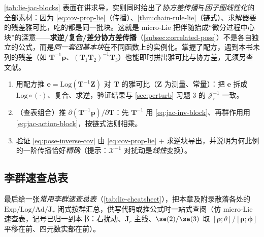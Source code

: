 \begin{insight}[一张表打通“求导”与“传播”]
\cref{tab:lie-jac-blocks} 表面在讲求导，实则同时给出了\emph{协方差传播}与\emph{因子图线性化}的全部素材：因为 \cref{eq:cov-prop-lie}（传播）、\cref{thm:chain-rule-lie}（链式）、求解器要的残差雅可比，吃的都是同一批块。这就是 micro-Lie 把伴随抬成“微分过程中心块”的深意——\textbf{求逆/复合/差分协方差传播}（\cref{subsec:correlated-pose}）不是各自独立的公式，而是\emph{同一套四基本块}在不同函数上的实例化。掌握了配方，遇到本书未列的残差（如 $\mathbf{T}^{-1}\mathbf{p}$、$(\mathbf{T}_1\mathbf{T}_2)^{-1}\mathbf{T}_3$）也能即时拼出雅可比与协方差，无须另查文献。
\end{insight}

\begin{practice}
\begin{enumerate}
  \item 用配方推 $\mathbf{e}=\mathrm{Log}(\mathbf{T}^{-1}\mathbf{Z})$ 对 $\mathbf{T}$ 的雅可比（$\mathbf{Z}$ 为测量、常量）：把 $\mathbf{e}$ 拆成 $\mathrm{Log}\circ(\cdot)$、复合、求逆，验证结果与 \cref{sec:perturb} 习题 3 的 $\boldsymbol{\mathcal{J}}_r^{-1}$ 一致。
  \item （查表组合）推 $\partial(\mathbf{T}^{-1}\mathbf{p})/\partial\mathbf{T}$：先 $\mathbf{T}^{-1}$ 用 \cref{eq:jac-inv-block}、再群作用用 \cref{eq:jac-action-block}，按链式法则相乘。
  \item 验证 \cref{eq:pose-inverse-cov} 由 \cref{eq:cov-prop-lie} + 求逆块导出，并说明为何此例的一阶传播恰好\emph{精确}（提示：$\mathcal{X}^{-1}$ 对扰动是\emph{线性}变换）。
\end{enumerate}
\end{practice}

\subsection{李群速查总表}
\label{subsec:lie-cheatsheet}

最后给一张\emph{常用李群速查总表}（\cref{tab:lie-cheatsheet}），把本章及附录散落各处的 $\mathrm{Exp}/\mathrm{Log}/\mathrm{Ad}/\mathbf{J}_r$ 闭式按群汇总，供写代码或推公式时一站式查阅（仿 micro-Lie\cite{sola2018micro} 速查表，记号已归一到本书：右扰动、$\mathbf{J}_r$ 主线、$\se(2)/\se(3)$ 取 $[\boldsymbol{\rho};\theta]$/$[\boldsymbol{\rho};\boldsymbol{\phi}]$ 平移在前、四元数实部在前）。

